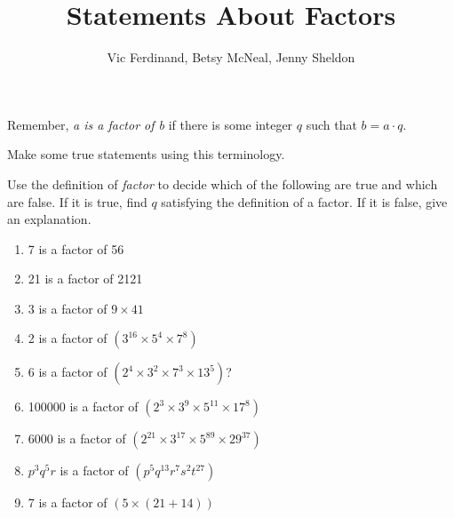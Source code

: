 \documentclass{ximera}
\title{Statements About Factors}
\author{Vic Ferdinand, Betsy McNeal, Jenny Sheldon}
\begin{document}
\begin{abstract} \end{abstract}
\maketitle




Remember, \emph{a is a factor of b} if there is some integer $q$ such that $b = a \cdot q$.
\begin{problem}
 Make some true statements using this terminology.
\end{problem}

\begin{problem}
Use the definition of \emph{factor} to decide which of the following are true and which are false. If it is true, find $q$ satisfying the definition of a factor. If it is false, give an explanation.

\begin{enumerate}
\item 7 is a factor of 56 
\item \label{Statementsb} 21 is a factor of 2121
\item \label{Statementsc} 3 is a factor of $9 \times 41$
\item \label{Statementsd} 2 is a factor of $(3^{16} \times 5^4 \times 7^8)$
\item \label{Statementse} 6 is a factor of $(2^4 \times 3^2 \times 7^3 \times 13^5)$?
\item \label{Statementsf} 100000 is a factor of  $(2^3 \times 3^9 \times 5^{11} \times17^8)$
\item \label{Statementsg} 6000  is a factor of  $(2^{21} \times 3^{17} \times 5^{89} \times 29^{37})$
\item \label{Statementsh} $p^3q^5r$  is a factor of $(p^5q^{13}r^7s^2t^{27}) $
\item \label{Statementsi} 7 is a factor of $(5 \times (21+14))$
\end{enumerate}
\end{problem}
\end{document}
